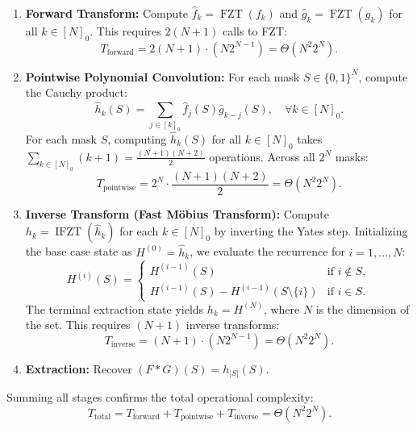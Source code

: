 \documentclass[11pt, letterpaper]{article}
\begin{document}
\begin{enumerate}
    \item \textbf{Forward Transform:} Compute $\hat{f}_k = \operatorname{FZT}(f_k)$ and $\hat{g}_k = \operatorname{FZT}(g_k)$ for all $k \in [N]_0$. 
    This requires $2(N+1)$ calls to FZT:
    \begin{equation}
        T_{\text{forward}} = 2(N+1) \cdot (N 2^{N-1}) = \Theta(N^2 2^N).
    \end{equation}
    \item \textbf{Pointwise Polynomial Convolution:} For each mask $S \in \{0, 1\}^N$, compute the Cauchy product:
    \begin{equation}
        \hat{h}_k(S) = \sum_{j \in [k]_0} \hat{f}_j(S) \hat{g}_{k-j}(S), \quad \forall k \in [N]_0.
    \end{equation}
    For each mask $S$, computing $\hat{h}_k(S)$ for all $k \in [N]_0$ takes $\sum_{k \in [N]_0} (k+1) = \frac{(N+1)(N+2)}{2}$ operations.
    Across all $2^N$ masks:
    \begin{equation}
        T_{\text{pointwise}} = 2^N \cdot \frac{(N+1)(N+2)}{2} = \Theta(N^2 2^N).
    \end{equation}
    \item \textbf{Inverse Transform (Fast Möbius Transform):} Compute $h_k = \operatorname{IFZT}(\hat{h}_k)$ for each $k \in [N]_0$ by inverting the Yates step. Initializing the base case state as $H^{(0)} = \hat{h}_k$, we evaluate the recurrence for $i = 1, \dots, N$:
    \begin{equation}
        H^{(i)}(S) = \begin{cases}
            H^{(i-1)}(S) & \text{if } i \notin S, \\
            H^{(i-1)}(S) - H^{(i-1)}(S \setminus \{i\}) & \text{if } i \in S.
        \end{cases}
    \end{equation}
    The terminal extraction state yields $h_k = H^{(N)}$, where $N$ is the dimension of the set. This requires $(N+1)$ inverse transforms:
    \begin{equation}
        T_{\text{inverse}} = (N+1) \cdot (N 2^{N-1}) = \Theta(N^2 2^N).
    \end{equation}
    \item \textbf{Extraction:} Recover $(F * G)(S) = h_{|S|}(S)$.
\end{enumerate}
Summing all stages confirms the total operational complexity:
\begin{equation}
    T_{\text{total}} = T_{\text{forward}} + T_{\text{pointwise}} + T_{\text{inverse}} = \Theta(N^2 2^N).
\end{equation}
\end{document}

